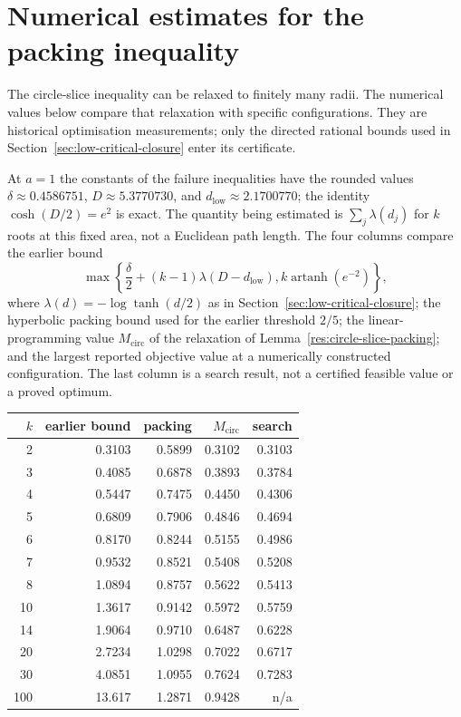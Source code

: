 \documentclass[11pt]{article}
\begin{document}
\appendix

\section{Numerical estimates for the packing inequality}
\label{sec:record-circle-slice}

The circle-slice inequality can be relaxed to finitely many radii.
The numerical values below compare that relaxation with specific
configurations. They are historical optimisation measurements; only
the directed rational bounds used in
Section~\ref{sec:low-critical-closure} enter its certificate.

At $a=1$ the constants of the failure inequalities have the rounded
values $\delta\approx0.4586751$, $D\approx5.3770730$, and
$d_{\mathrm{low}}\approx2.1700770$; the identity $\cosh(D/2)=e^{2}$ is exact. The quantity being estimated is
$\sum_j\lambda(d_j)$ for $k$ roots at this fixed area, not a Euclidean
path length. The four columns compare the earlier bound
\[
 \max\!\left\{\frac\delta2+(k-1)\lambda(D-d_{\mathrm{low}}),
                  k\operatorname{artanh}(e^{-2})\right\},
\]
where $\lambda(d)=-\log\tanh(d/2)$ as in
Section~\ref{sec:low-critical-closure}; the hyperbolic packing bound used
for the earlier threshold $2/5$; the linear-programming value
$M_{\mathrm{circ}}$ of the relaxation of
Lemma~\ref{res:circle-slice-packing}; and the largest reported objective
value at a numerically constructed configuration. The last column is a
search result, not a certified feasible value or a proved optimum.

\begin{center}
\begin{tabular}{@{}rrrrr@{}}
\toprule
$k$ & earlier bound & packing & $M_{\mathrm{circ}}$ & search \\
\midrule
2 & 0.3103 & 0.5899 & 0.3102 & 0.3103 \\
3 & 0.4085 & 0.6878 & 0.3893 & 0.3784 \\
4 & 0.5447 & 0.7475 & 0.4450 & 0.4306 \\
5 & 0.6809 & 0.7906 & 0.4846 & 0.4694 \\
6 & 0.8170 & 0.8244 & 0.5155 & 0.4986 \\
7 & 0.9532 & 0.8521 & 0.5408 & 0.5208 \\
8 & 1.0894 & 0.8757 & 0.5622 & 0.5413 \\
10 & 1.3617 & 0.9142 & 0.5972 & 0.5759 \\
14 & 1.9064 & 0.9710 & 0.6487 & 0.6228 \\
20 & 2.7234 & 1.0298 & 0.7022 & 0.6717 \\
30 & 4.0851 & 1.0955 & 0.7624 & 0.7283 \\
100 & 13.617 & 1.2871 & 0.9428 & n/a \\
\bottomrule
\end{tabular}
\end{center}
\end{document}
